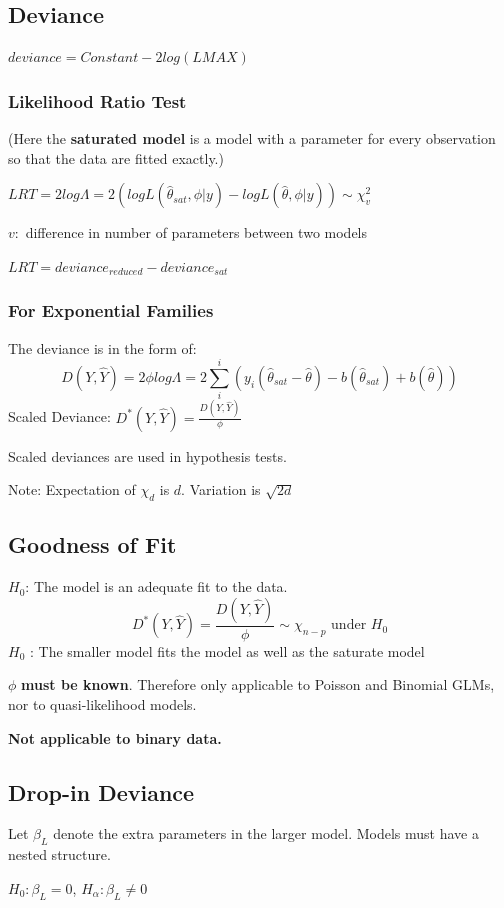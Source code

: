 \documentclass[10pt,landscape, fleqn]{article}
\begin{document}
\begin{multicols}{3}
			\subsection{Deviance}
				$ deviance = Constant - 2log(LMAX) $
				\subsubsection{Likelihood Ratio Test}
				(Here the \textbf{saturated model} is a model with a parameter for every observation so that the data are fitted exactly.) \par 
				$ LRT = 2log\Lambda = 2(log L(\hat{\theta}_{sat}, \phi|y) -log L(\hat{\theta}, \phi|y) ) \sim \chi_v^2 $ \par 
				$v: $ difference in number of parameters between two models \par
				$ LRT = deviance_{reduced} - deviance_{sat} $ \par 
				\subsubsection{For Exponential Families}
				The deviance is in the form of:
				\[ D(Y, \hat{Y}) = 2\phi log\Lambda = 2\sum_{i}^{i}(y_i(\hat{\theta}_{sat}-\hat{\theta})-b(\hat{\theta}_{sat}) + b(\hat{\theta})) \]
				Scaled Deviance: $ D^*(Y, \hat{Y}) = \frac{D(Y, \hat{Y})}{\phi}$ \par 
				Scaled deviances are used in hypothesis tests.\par 
				Note: Expectation of $\chi_{d}$ is $d$. Variation is $\sqrt{2d}$
			\subsection{Goodness of Fit}
				$H_0$: The model is an adequate fit to the data.
				\[ D^*(Y, \hat{Y}) = \frac{D(Y, \hat{Y})}{\phi} \sim \chi_{n-p} \mbox{ under }H_0 \]
				$H_0$ : The smaller model fits the model as well as the saturate model \par 
				$\phi$ \textbf{must be known}. Therefore only applicable to Poisson and Binomial GLMs, nor to quasi-likelihood models. \par 
				\textbf{Not applicable to binary data.}
			\subsection{Drop-in Deviance}
				Let $\beta_L$ denote the extra parameters in the larger model. Models must have a nested structure. \par 
				$H_0: \beta_L = 0$, $H_\alpha: \beta_L \neq 0$

\end{multicols}
\end{document}
